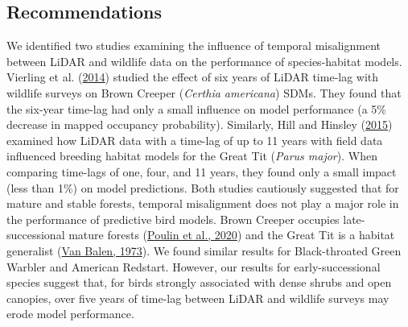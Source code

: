 \documentclass[
  12pt,
]{article}
\begin{document}
\hypertarget{recommendations}{%
\subsection{Recommendations}\label{recommendations}}

We identified two studies examining the influence of temporal misalignment between LiDAR and wildlife data on the performance of species-habitat models. Vierling et al. (\protect\hyperlink{ref-VierlingSwift2014}{2014}) studied the effect of six years of LiDAR time-lag with wildlife surveys on Brown Creeper (\emph{Certhia americana}) SDMs. They found that the six-year time-lag had only a small influence on model performance (a 5\% decrease in mapped occupancy probability). Similarly, Hill and Hinsley (\protect\hyperlink{ref-hillAirborneLidarWoodland2015}{2015}) examined how LiDAR data with a time-lag of up to 11 years with field data influenced breeding habitat models for the Great Tit (\emph{Parus major}). When comparing time-lags of one, four, and 11 years, they found only a small impact (less than 1\%) on model predictions. Both studies cautiously suggested that for mature and stable forests, temporal misalignment does not play a major role in the performance of predictive bird models. Brown Creeper occupies late-successional mature forests (\protect\hyperlink{ref-poulinBrownCreeperCerthia2020}{Poulin et al., 2020}) and the Great Tit is a habitat generalist (\protect\hyperlink{ref-vanbalenComparativeSudyBreeding1973}{Van Balen, 1973}). We found similar results for Black-throated Green Warbler and American Redstart. However, our results for early-successional species suggest that, for birds strongly associated with dense shrubs and open canopies, over five years of time-lag between LiDAR and wildlife surveys may erode model performance.
\end{document}
